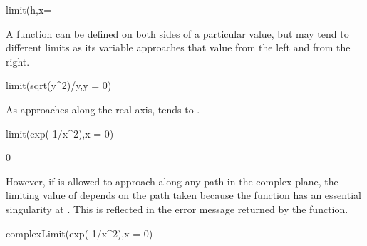 {{{{{{{{\begin{xtc}
\begin{spadsrc}
limit(h,x=%
\end{spadsrc}
\begin{TeXOutput}
\begin{fricasmath}{4}
%
\end{fricasmath}
\end{TeXOutput}
\end{xtc}
\begin{xtc}
\begin{xtccomment}
A function can be defined on both sides of a particular value, but
may tend to different limits as its variable approaches that value from the
left and from the right.
\end{xtccomment}
\begin{spadsrc}
limit(sqrt(y^2)/y,y = 0)
\end{spadsrc}
\begin{TeXOutput}
\begin{fricasmath}{5}
%
\end{fricasmath}
\end{TeXOutput}
\end{xtc}
\begin{xtc}
\begin{xtccomment}
As  approaches  along the real axis, 
tends to .
\end{xtccomment}
\begin{spadsrc}
limit(exp(-1/x^2),x = 0)
\end{spadsrc}
\begin{TeXOutput}
\begin{fricasmath}{6}
0%
\end{fricasmath}
\end{TeXOutput}
\end{xtc}
\begin{xtc}
\begin{xtccomment}
However, if  is allowed to approach  along any path in the
complex plane, the limiting value of  depends on the
path taken because the function has an essential singularity at .
This is reflected in the error message returned by the function.
\end{xtccomment}
\begin{spadsrc}
complexLimit(exp(-1/x^2),x = 0)
\end{spadsrc}
\begin{TeXOutput}
\begin{fricasmath}{7}
%
\end{fricasmath}
\end{TeXOutput}
\end{xtc}

}}}}}}}}
